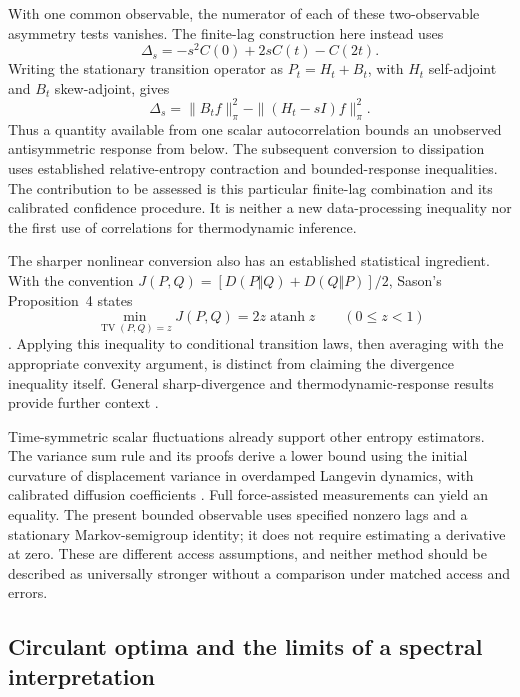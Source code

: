 With one common observable, the numerator of each of these two-observable
asymmetry tests vanishes. The finite-lag construction here instead uses
\[
 \Delta_s=-s^2 C(0)+2sC(t)-C(2t).
\]
Writing the stationary transition operator as $P_t=H_t+B_t$, with $H_t$
self-adjoint and $B_t$ skew-adjoint, gives
\[
 \Delta_s=\|B_t f\|_\pi^2-\|(H_t-sI)f\|_\pi^2.
\]
Thus a quantity available from one scalar autocorrelation bounds an
unobserved antisymmetric response from below. The subsequent conversion to
dissipation uses established relative-entropy contraction and bounded-response
inequalities. The contribution to be assessed is this particular finite-lag
combination and its calibrated confidence procedure. It is neither a new
data-processing inequality nor the first use of correlations for thermodynamic
inference.

The sharper nonlinear conversion also has an established statistical ingredient.
With the convention
$J(P,Q)=[D(P\Vert Q)+D(Q\Vert P)]/2$, Sason's Proposition~4 states
\[
 \min_{\operatorname{TV}(P,Q)=z}J(P,Q)=2z\operatorname{atanh}z
 \qquad (0\leq z<1)
\]
\cite{paSason2015}. Applying this inequality to conditional transition laws,
then averaging with the appropriate convexity argument, is distinct from
claiming the divergence inequality itself. General sharp-divergence and
thermodynamic-response results provide further context
\cite{ciGuntuboyina2014,ciFalasco2022}.

Time-symmetric scalar fluctuations already support other entropy estimators.
The variance sum rule and its proofs derive a lower bound using the initial
curvature of displacement variance in overdamped Langevin dynamics, with
calibrated diffusion coefficients \cite{ciVSR2024,ciVSRProofs2024}. Full
force-assisted measurements can yield an equality. The present bounded
observable uses specified nonzero lags and a stationary Markov-semigroup
identity; it does not require estimating a derivative at zero. These are
different access assumptions, and neither method should be described as
universally stronger without a comparison under matched access and errors.

\subsection{Circulant optima and the limits of a spectral interpretation}

